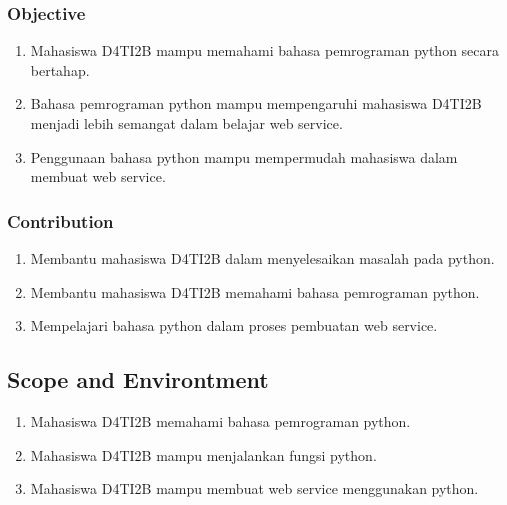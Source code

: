 \subsubsection{Objective}
\begin{enumerate}
	\item Mahasiswa D4TI2B mampu memahami bahasa pemrograman python secara bertahap.
	\item Bahasa pemrograman python mampu mempengaruhi mahasiswa D4TI2B menjadi lebih semangat dalam belajar web service.
	\item Penggunaan bahasa python mampu mempermudah mahasiswa dalam membuat web service.
\end{enumerate}
\subsubsection{Contribution}
\begin{enumerate}
	\item Membantu mahasiswa D4TI2B dalam menyelesaikan masalah pada python.
	\item Membantu mahasiswa D4TI2B memahami bahasa pemrograman python.
	\item Mempelajari bahasa python dalam proses pembuatan web service.
\end{enumerate}
		
\subsection{Scope and Environtment}
\begin{enumerate}
	\item Mahasiswa D4TI2B memahami bahasa pemrograman python.
	\item Mahasiswa D4TI2B mampu menjalankan fungsi python.
	\item Mahasiswa D4TI2B mampu membuat web service menggunakan python.
\end{enumerate}
